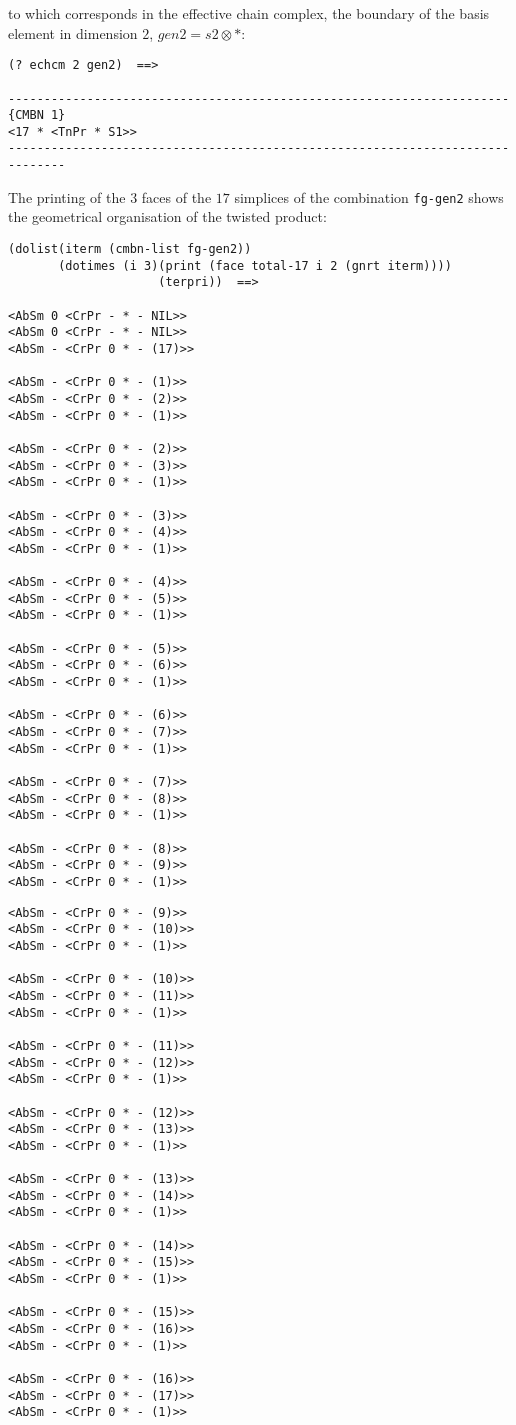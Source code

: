 to which corresponds in the effective chain complex, the boundary of the basis
element in dimension $2$, $gen2=s2 \otimes *$:
{\footnotesize\begin{verbatim}
(? echcm 2 gen2)  ==>

----------------------------------------------------------------------{CMBN 1}
<17 * <TnPr * S1>>
------------------------------------------------------------------------------
\end{verbatim}}
The printing of the $3$ faces of the $17$ simplices of the combination
{\tt fg-gen2} shows the geometrical organisation of the twisted product:
{\footnotesize\begin{verbatim}
(dolist(iterm (cmbn-list fg-gen2))
       (dotimes (i 3)(print (face total-17 i 2 (gnrt iterm))))
                     (terpri))  ==>

<AbSm 0 <CrPr - * - NIL>>
<AbSm 0 <CrPr - * - NIL>>
<AbSm - <CrPr 0 * - (17)>>

<AbSm - <CrPr 0 * - (1)>>
<AbSm - <CrPr 0 * - (2)>>
<AbSm - <CrPr 0 * - (1)>>

<AbSm - <CrPr 0 * - (2)>>
<AbSm - <CrPr 0 * - (3)>>
<AbSm - <CrPr 0 * - (1)>>

<AbSm - <CrPr 0 * - (3)>>
<AbSm - <CrPr 0 * - (4)>>
<AbSm - <CrPr 0 * - (1)>>

<AbSm - <CrPr 0 * - (4)>>
<AbSm - <CrPr 0 * - (5)>>
<AbSm - <CrPr 0 * - (1)>>

<AbSm - <CrPr 0 * - (5)>>
<AbSm - <CrPr 0 * - (6)>>
<AbSm - <CrPr 0 * - (1)>>

<AbSm - <CrPr 0 * - (6)>>
<AbSm - <CrPr 0 * - (7)>>
<AbSm - <CrPr 0 * - (1)>>

<AbSm - <CrPr 0 * - (7)>>
<AbSm - <CrPr 0 * - (8)>>
<AbSm - <CrPr 0 * - (1)>>

<AbSm - <CrPr 0 * - (8)>>
<AbSm - <CrPr 0 * - (9)>>
<AbSm - <CrPr 0 * - (1)>>
\end{verbatim}}
\newpage
{\footnotesize\begin{verbatim}
<AbSm - <CrPr 0 * - (9)>>
<AbSm - <CrPr 0 * - (10)>>
<AbSm - <CrPr 0 * - (1)>>

<AbSm - <CrPr 0 * - (10)>>
<AbSm - <CrPr 0 * - (11)>>
<AbSm - <CrPr 0 * - (1)>>

<AbSm - <CrPr 0 * - (11)>>
<AbSm - <CrPr 0 * - (12)>>
<AbSm - <CrPr 0 * - (1)>>

<AbSm - <CrPr 0 * - (12)>>
<AbSm - <CrPr 0 * - (13)>>
<AbSm - <CrPr 0 * - (1)>>

<AbSm - <CrPr 0 * - (13)>>
<AbSm - <CrPr 0 * - (14)>>
<AbSm - <CrPr 0 * - (1)>>

<AbSm - <CrPr 0 * - (14)>>
<AbSm - <CrPr 0 * - (15)>>
<AbSm - <CrPr 0 * - (1)>>

<AbSm - <CrPr 0 * - (15)>>
<AbSm - <CrPr 0 * - (16)>>
<AbSm - <CrPr 0 * - (1)>>

<AbSm - <CrPr 0 * - (16)>>
<AbSm - <CrPr 0 * - (17)>>
<AbSm - <CrPr 0 * - (1)>>
\end{verbatim}}

